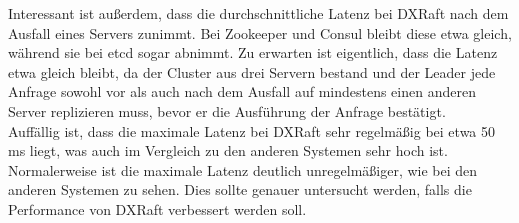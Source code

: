 Interessant ist außerdem, dass die durchschnittliche Latenz bei DXRaft nach dem Ausfall eines Servers zunimmt. Bei Zookeeper und Consul bleibt diese etwa gleich, während sie bei etcd sogar abnimmt. Zu erwarten ist eigentlich, dass die Latenz etwa gleich bleibt, da der Cluster aus drei Servern bestand und der Leader jede Anfrage sowohl vor als auch nach dem Ausfall auf mindestens einen anderen Server replizieren muss, bevor er die Ausführung der Anfrage bestätigt. \\
Auffällig ist, dass die maximale Latenz bei DXRaft sehr regelmäßig bei etwa 50 ms liegt, was auch im Vergleich zu den anderen Systemen sehr hoch ist. Normalerweise ist die maximale Latenz deutlich unregelmäßiger, wie bei den anderen Systemen zu sehen. Dies sollte genauer untersucht werden, falls die Performance von DXRaft verbessert werden soll.


